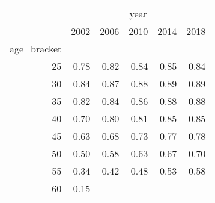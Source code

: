 \documentclass{article}
\begin{document}
\begin{table}[!h]
\centering
\begin{tabular}{llllll}
\cline{1-6}
\multicolumn{1}{c}{} &
  \multicolumn{5}{|c}{year} \\
\multicolumn{1}{c}{} &
  \multicolumn{1}{|r}{2002} &
  \multicolumn{1}{r}{2006} &
  \multicolumn{1}{r}{2010} &
  \multicolumn{1}{r}{2014} &
  \multicolumn{1}{r}{2018} \\
\cline{1-6}
\multicolumn{1}{r}{age\_bracket} &
  \multicolumn{1}{|r}{} &
  \multicolumn{1}{r}{} &
  \multicolumn{1}{r}{} &
  \multicolumn{1}{r}{} &
  \multicolumn{1}{r}{} \\
\multicolumn{1}{r}{25\hspace{1em}} &
  \multicolumn{1}{|r}{0.78} &
  \multicolumn{1}{r}{0.82} &
  \multicolumn{1}{r}{0.84} &
  \multicolumn{1}{r}{0.85} &
  \multicolumn{1}{r}{0.84} \\
\multicolumn{1}{r}{30\hspace{1em}} &
  \multicolumn{1}{|r}{0.84} &
  \multicolumn{1}{r}{0.87} &
  \multicolumn{1}{r}{0.88} &
  \multicolumn{1}{r}{0.89} &
  \multicolumn{1}{r}{0.89} \\
\multicolumn{1}{r}{35\hspace{1em}} &
  \multicolumn{1}{|r}{0.82} &
  \multicolumn{1}{r}{0.84} &
  \multicolumn{1}{r}{0.86} &
  \multicolumn{1}{r}{0.88} &
  \multicolumn{1}{r}{0.88} \\
\multicolumn{1}{r}{40\hspace{1em}} &
  \multicolumn{1}{|r}{0.70} &
  \multicolumn{1}{r}{0.80} &
  \multicolumn{1}{r}{0.81} &
  \multicolumn{1}{r}{0.85} &
  \multicolumn{1}{r}{0.85} \\
\multicolumn{1}{r}{45\hspace{1em}} &
  \multicolumn{1}{|r}{0.63} &
  \multicolumn{1}{r}{0.68} &
  \multicolumn{1}{r}{0.73} &
  \multicolumn{1}{r}{0.77} &
  \multicolumn{1}{r}{0.78} \\
\multicolumn{1}{r}{50\hspace{1em}} &
  \multicolumn{1}{|r}{0.50} &
  \multicolumn{1}{r}{0.58} &
  \multicolumn{1}{r}{0.63} &
  \multicolumn{1}{r}{0.67} &
  \multicolumn{1}{r}{0.70} \\
\multicolumn{1}{r}{55\hspace{1em}} &
  \multicolumn{1}{|r}{0.34} &
  \multicolumn{1}{r}{0.42} &
  \multicolumn{1}{r}{0.48} &
  \multicolumn{1}{r}{0.53} &
  \multicolumn{1}{r}{0.58} \\
\multicolumn{1}{r}{60\hspace{1em}} &
  \multicolumn{1}{|r}{0.15} &

\end{tabular}
\end{table}
\end{document}
